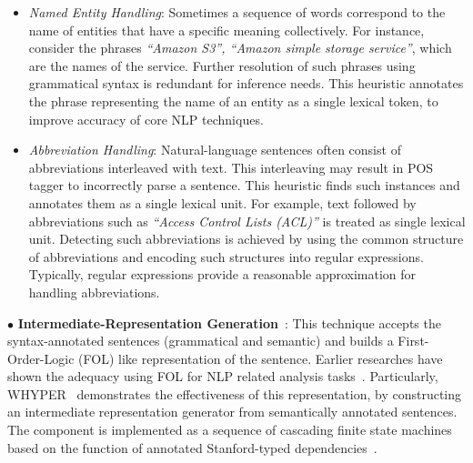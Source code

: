 
\begin{itemize}

\item \textit{Named Entity Handling}: Sometimes a sequence of words correspond to the name of entities that have a specific meaning collectively.
For instance, consider the phrases \textit{``Amazon S3'', ``Amazon simple storage service''}, which are the names of the service.
Further resolution of such phrases using grammatical syntax is redundant for inference needs.
This heuristic annotates the phrase representing the name of an entity as a single lexical token,
to improve accuracy of core NLP techniques.
	
\item \textit{Abbreviation Handling}: Natural-language sentences often consist of abbreviations interleaved with text.
This interleaving may result in POS tagger to incorrectly parse a sentence.
This heuristic finds such instances and annotates them as a single lexical unit.
For example, text followed by abbreviations such as \textit{``Access Control Lists (ACL)''} is treated as single lexical unit.
Detecting such abbreviations is achieved by using the common structure of abbreviations and encoding such structures into regular expressions.
Typically, regular expressions provide a reasonable approximation for handling abbreviations. 

\end{itemize}

{\small $\bullet$} \textbf{Intermediate-Representation Generation}~\cite{pandita13:WHYPER}:
This technique accepts the syntax-annotated sentences (grammatical and semantic) and builds a First-Order-Logic (FOL) like representation of the sentence.
Earlier researches have shown the adequacy using FOL for NLP related analysis tasks~\cite{Sinha2009,Sinha2010,pandita12:inferring}.
Particularly, WHYPER~\cite{pandita13:WHYPER} demonstrates the effectiveness of this representation, by constructing an intermediate representation generator from semantically annotated sentences. 
The component is implemented as a sequence of cascading finite state machines based on the function of annotated Stanford-typed dependencies~\cite{Marneffe06LREC,Marneffe08COLING,Klein03,KleinNIPS03}.

